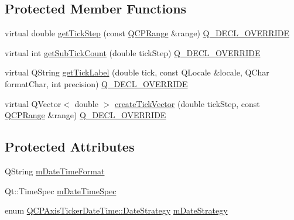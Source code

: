 \subsection*{Protected Member Functions}
\begin{DoxyCompactItemize}
\item 
virtual double \mbox{\hyperlink{class_q_c_p_axis_ticker_date_time_a0560c14a3f87bb99ab136aca8321b32a}{get\+Tick\+Step}} (const \mbox{\hyperlink{class_q_c_p_range}{Q\+C\+P\+Range}} \&range) \mbox{\hyperlink{qcustomplot_8h_a42cc5eaeb25b85f8b52d2a4b94c56f55}{Q\+\_\+\+D\+E\+C\+L\+\_\+\+O\+V\+E\+R\+R\+I\+DE}}
\item 
virtual int \mbox{\hyperlink{class_q_c_p_axis_ticker_date_time_a78dece0d51426a3c310528d413e09193}{get\+Sub\+Tick\+Count}} (double tick\+Step) \mbox{\hyperlink{qcustomplot_8h_a42cc5eaeb25b85f8b52d2a4b94c56f55}{Q\+\_\+\+D\+E\+C\+L\+\_\+\+O\+V\+E\+R\+R\+I\+DE}}
\item 
virtual Q\+String \mbox{\hyperlink{class_q_c_p_axis_ticker_date_time_a4dc6a03f7ea5c619477528a683ed5c18}{get\+Tick\+Label}} (double tick, const Q\+Locale \&locale, Q\+Char format\+Char, int precision) \mbox{\hyperlink{qcustomplot_8h_a42cc5eaeb25b85f8b52d2a4b94c56f55}{Q\+\_\+\+D\+E\+C\+L\+\_\+\+O\+V\+E\+R\+R\+I\+DE}}
\item 
virtual Q\+Vector$<$ double $>$ \mbox{\hyperlink{class_q_c_p_axis_ticker_date_time_a44c2c09a303d281801b69226e243047d}{create\+Tick\+Vector}} (double tick\+Step, const \mbox{\hyperlink{class_q_c_p_range}{Q\+C\+P\+Range}} \&range) \mbox{\hyperlink{qcustomplot_8h_a42cc5eaeb25b85f8b52d2a4b94c56f55}{Q\+\_\+\+D\+E\+C\+L\+\_\+\+O\+V\+E\+R\+R\+I\+DE}}
\end{DoxyCompactItemize}
\subsection*{Protected Attributes}
\begin{DoxyCompactItemize}
\item 
Q\+String \mbox{\hyperlink{class_q_c_p_axis_ticker_date_time_adbbb25add598377998c0c57dbd29adaf}{m\+Date\+Time\+Format}}
\item 
Qt\+::\+Time\+Spec \mbox{\hyperlink{class_q_c_p_axis_ticker_date_time_a5f5abe83c371f13eb3415585e638dba9}{m\+Date\+Time\+Spec}}
\item 
enum \mbox{\hyperlink{class_q_c_p_axis_ticker_date_time_af2c7c60821a6234ca7a172f42ef7f1d8}{Q\+C\+P\+Axis\+Ticker\+Date\+Time\+::\+Date\+Strategy}} \mbox{\hyperlink{class_q_c_p_axis_ticker_date_time_a93fca912446ca341bee277cb2cc84e49}{m\+Date\+Strategy}}
\end{DoxyCompactItemize}
